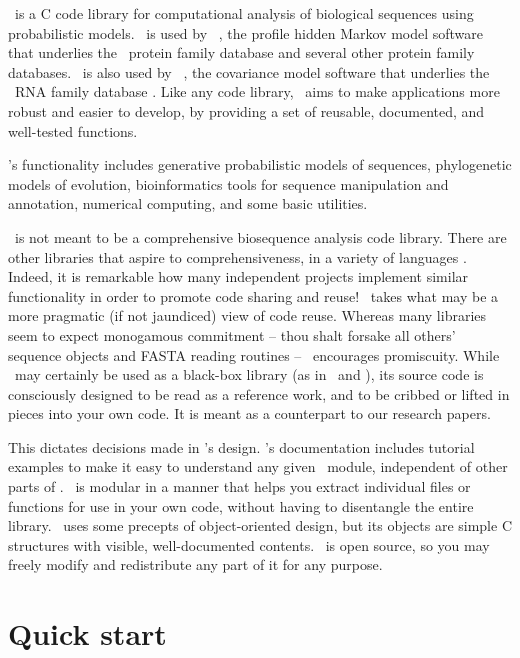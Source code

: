 

\Easel\ is a C code library for computational analysis of biological
sequences using probabilistic models. \Easel\ is used by \HMMER\ 
\citep{hmmer,Eddy98}, the profile hidden Markov model software that
underlies the \Pfam\ protein family database
\citep{Finn06,Sonnhammer97} and several other protein family
databases. \Easel\ is also used by \Infernal\ 
\citep{infernal,NawrockiEddy07}, the covariance model software that
underlies the \Rfam\ RNA family database
\citep{Griffiths-Jones05}. Like any code library, \Easel\ aims to make
applications more robust and easier to develop, by providing a set of
reusable, documented, and well-tested functions.

\Easel's functionality includes generative probabilistic models of
sequences, phylogenetic models of evolution, bioinformatics tools for
sequence manipulation and annotation, numerical computing, and some
basic utilities.

\Easel\ is not meant to be a comprehensive biosequence analysis code
library. There are other libraries that aspire to comprehensiveness,
in a variety of languages
\citep{Vahrson96,Pitt01,Mangalam02,Butt05,Dutheil06,Giancarlo07,Doring08}.
Indeed, it is remarkable how many independent projects implement
similar functionality in order to promote code sharing and reuse!
\Easel\ takes what may be a more pragmatic (if not jaundiced) view of
code reuse.  Whereas many libraries seem to expect monogamous
commitment -- thou shalt forsake all others' sequence objects and
FASTA reading routines -- \Easel\ encourages promiscuity. While
\Easel\ may certainly be used as a black-box library (as in \HMMER\
and \Infernal), its source code is consciously designed to be read as
a reference work, and to be cribbed or lifted in pieces into your own
code. It is meant as a counterpart to our research papers.

This dictates decisions made in \Easel's design.  \Easel's
documentation includes tutorial examples to make it easy to understand
any given \Easel\ module, independent of other parts of \Easel.
\Easel\ is modular in a manner that helps you extract individual files
or functions for use in your own code, without having to disentangle
the entire library. \Easel\ uses some precepts of object-oriented
design, but its objects are simple C structures with visible,
well-documented contents. \Easel\ is open source, so you may freely
modify and redistribute any part of it for any purpose.

\section{Quick start}

